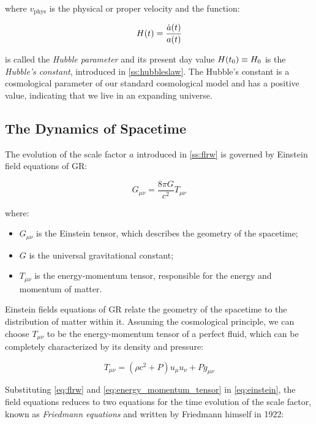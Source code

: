where $v_{\text{phys}}$ is the physical or proper velocity and the function:

\begin{equation}
        H\qty(t) = \frac{\dot a\qty(t)}{a\qty(t)}
        \label{eq:hubble_parameter}
\end{equation}

is called the \emph{Hubble parameter} and its present day value $H\qty(t_0)
\equiv H_0$ is the \emph{Hubble's constant}, introduced in
\autoref{ss:hubbleslaw}. The Hubble's constant is a cosmological
parameter of our standard cosmological model and has a positive value,
indicating that we live in an expanding universe.

\subsection{The Dynamics of Spacetime}

The evolution of the scale factor $a$ introduced in \autoref{ss:flrw} is
governed by Einstein field equations of GR:

\begin{equation}
        G_{\mu \nu} = \frac{8 \pi G}{c^2} T_{\mu \nu}
        \label{eq:einstein}
\end{equation}

where:

\begin{itemize}
        \item $G_{\mu \nu}$ is the Einstein tensor, which describes the
        geometry of the spacetime;
        \item $G$ is the universal gravitational constant;
        \item $T_{\mu \nu}$ is the energy-momentum tensor, responsible for
        the energy and momentum of matter.
\end{itemize}

Einstein fields equations of GR relate the geometry of the spacetime to the
distribution of matter within it. Assuming the cosmological principle, we
can choose $T_{\mu \nu}$ to be the energy-momentum tensor of a perfect
fluid, which can be completely characterized by its density and pressure:

\begin{equation}
         T_{\mu \nu} = (\rho c^2 + P)u_\mu u_\nu + P g_{\mu \nu}
         \label{eq:energy_momentum_tensor}
\end{equation}

Substituting \autoref{eq:flrw} and \autoref{eq:energy_momentum_tensor} in
\autoref{eq:einstein}, the field equations reduces to two equations for the
time evolution of the scale factor, known as \emph{Friedmann equations} and
written by Friedmann himself in 1922:

